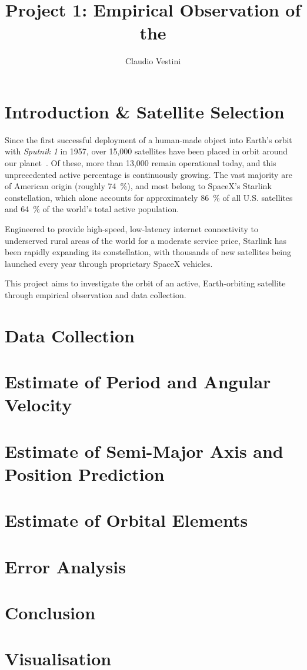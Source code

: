 \documentclass{article}
\title{Project 1: Empirical Observation of the }
\author{Claudio Vestini}
\begin{document}
\maketitle

\section{Introduction \& Satellite Selection}

Since the first successful deployment of a human-made object into Earth's orbit with \textit{Sputnik 1} in 1957, over 15,000 satellites have been placed in orbit around our planet~\cite{lookup-lepoint2025}. Of these, more than 13,000 remain operational today, and this unprecedented active percentage is continuously growing. The vast majority are of American origin (roughly \SI{74}{\percent}), and most belong to SpaceX's Starlink constellation, which alone accounts for approximately \SI{86}{\percent} of all U.S. satellites and \SI{64}{\percent} of the world's total active population.

Engineered to provide high-speed, low-latency internet connectivity to underserved rural areas of the world for a moderate service price, Starlink has been rapidly expanding its constellation, with thousands of new satellites being launched every year through proprietary SpaceX vehicles. 

This project aims to investigate the orbit of an active, Earth-orbiting satellite through empirical observation and data collection.

\section{Data Collection}

\section{Estimate of Period and Angular Velocity}

\section{Estimate of Semi-Major Axis and Position Prediction}

\section{Estimate of Orbital Elements}

\section{Error Analysis}

\section{Conclusion}

\section{Visualisation}

\printbibliography
\end{document}
